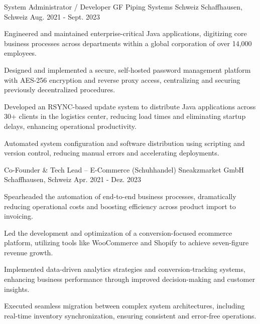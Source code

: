 \begin{cventries}
\cventry
  {System Administrator / Developer}
  {GF Piping Systems Schweiz}
  {Schaffhausen, Schweiz}
  {Aug. 2021 - Sept. 2023}
  {
    \begin{cvitems}
\item {Engineered and maintained enterprise-critical Java applications, digitizing core business processes across departments within a global corporation of over 14,000 employees.}
\item {Designed and implemented a secure, self-hosted password management platform with AES-256 encryption and reverse proxy access, centralizing and securing previously decentralized procedures.}
\item {Developed an RSYNC-based update system to distribute Java applications across 30+ clients in the logistics center, reducing load times and eliminating startup delays, enhancing operational productivity.}
\item {Automated system configuration and software distribution using scripting and version control, reducing manual errors and accelerating deployments.}
\end{cvitems}
  }

\cventry
  {Co-Founder \& Tech Lead – E-Commerce (Schuhhandel)}
  {Sneakzmarket GmbH}
  {Schaffhausen, Schweiz}
  {Apr. 2021 - Dez. 2023}
  {
    \begin{cvitems}
\item {Spearheaded the automation of end-to-end business processes, dramatically reducing operational costs and boosting efficiency across product import to invoicing.}
\item {Led the development and optimization of a conversion-focused ecommerce platform, utilizing tools like WooCommerce and Shopify to achieve seven-figure revenue growth.}
\item {Implemented data-driven analytics strategies and conversion-tracking systems, enhancing business performance through improved decision-making and customer insights.}
\item {Executed seamless migration between complex system architectures, including real-time inventory synchronization, ensuring consistent and error-free operations.}
\end{cvitems}
  }


\end{cventries}
